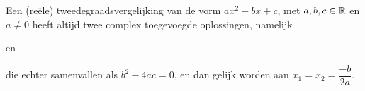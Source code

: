 \documentclass{ximera}
\begin{document}
	\author{Wiskunde Op Maat}


\begin{proposition}\nl

    Een (reële) tweedegraadsvergelijking van de vorm $ax^2+bx+c$, met $a,b,c\in\mathbb{R}$ en $a\neq0$
    heeft altijd twee complex toegevoegde oplossingen, namelijk 
    \begin{center}
         en 
    \end{center}
    die echter samenvallen als $b^2-4ac=0$, en dan gelijk worden aan $x_1=x_2=\dfrac{-b}{2a}$.
\end{proposition}

\begin{exercise}
    

\end{exercise}
\end{document}
